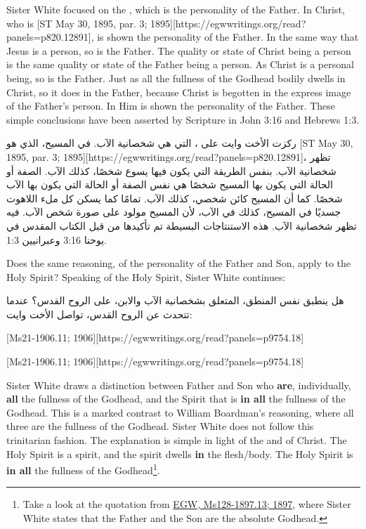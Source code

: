 Sister White focused on the , which is the personality of the Father. In Christ, who is [ST May 30, 1895, par. 3; 1895][https://egwwritings.org/read?panels=p820.12891], is shown the personality of the Father. In the same way that Jesus is a person, so is the Father. The quality or state of Christ being a person is the same quality or state of the Father being a person. As Christ is a personal being, so is the Father. Just as all the fullness of the Godhead bodily dwells in Christ, so it does in the Father, because Christ is begotten in the express image of the Father’s person. In Him is shown the personality of the Father. These simple conclusions have been asserted by Scripture in John 3:16 and Hebrews 1:3.


ركزت الأخت وايت على ، التي هي شخصانية الآب. في المسيح، الذي هو [ST May 30, 1895, par. 3; 1895][https://egwwritings.org/read?panels=p820.12891]، تظهر شخصانية الآب. بنفس الطريقة التي يكون فيها يسوع شخصًا، كذلك الآب. الصفة أو الحالة التي يكون بها المسيح شخصًا هي نفس الصفة أو الحالة التي يكون بها الآب شخصًا. كما أن المسيح كائن شخصي، كذلك الآب. تمامًا كما يسكن كل ملء اللاهوت جسديًا في المسيح، كذلك في الآب، لأن المسيح مولود على صورة شخص الآب. فيه تظهر شخصانية الآب. هذه الاستنتاجات البسيطة تم تأكيدها من قبل الكتاب المقدس في يوحنا 3:16 وعبرانيين 1:3.


Does the same reasoning, of the personality of the Father and Son, apply to the Holy Spirit? Speaking of the Holy Spirit, Sister White continues:


هل ينطبق نفس المنطق، المتعلق بشخصانية الآب والابن، على الروح القدس؟ عندما تتحدث عن الروح القدس، تواصل الأخت وايت:


[Ms21-1906.11; 1906][https://egwwritings.org/read?panels=p9754.18]


[Ms21-1906.11; 1906][https://egwwritings.org/read?panels=p9754.18]


Sister White draws a distinction between Father and Son who \textbf{are}, individually, \textbf{all} the fullness of the Godhead, and the Spirit that is \textbf{in all} the fullness of the Godhead. This is a marked contrast to William Boardman’s reasoning, where all three are the fullness of the Godhead. Sister White does not follow this trinitarian fashion. The explanation is simple in light of the  and of Christ. The Holy Spirit is a spirit, and the spirit dwells \textbf{in} the flesh/body. The Holy Spirit is \textbf{in all} the fullness of the Godhead\footnote{Take a look at the quotation from \href{https://egwwritings.org/?ref=en_Ms128-1897.13&para=5426.19}{{EGW, Ms128-1897.13; 1897}}, where Sister White states that the Father and the Son are the absolute Godhead.}.


